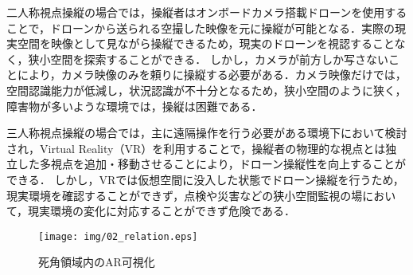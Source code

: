 \documentclass[submit, sigrecommended]{ipsj}
\begin{document}
二人称視点操縦の場合では，操縦者はオンボードカメラ搭載ドローンを使用することで，ドローンから送られる空撮した映像を元に操縦が可能となる\cite{article-drone08}．実際の現実空間を映像として見ながら操縦できるため，現実のドローンを視認することなく，狭小空間を探索することができる\cite{book-drone02}．
しかし，カメラが前方しか写さないことにより\cite{article-drone09}，カメラ映像のみを頼りに操縦する必要がある．カメラ映像だけでは，空間認識能力が低減し\cite{article-drone10}，状況認識が不十分となるため\cite{article-drone11}\cite{book-drone03}，狭小空間のように狭く，障害物が多いような環境では，操縦は困難である．
\par
三人称視点操縦の場合では，主に遠隔操作を行う必要がある環境下において検討され，Virtual Reality（VR）を利用することで，操縦者の物理的な視点とは独立した多視点を追加・移動させることにより，ドローン操縦性を向上することができる\cite{book-drone04}．
しかし，VRでは仮想空間に没入した状態でドローン操縦を行うため\cite{article-drone13}，現実環境を確認することができず，点検や災害などの狭小空間監視の場において，現実環境の変化に対応することができず危険である．


\begin{figure}[tb]
  \centering
  \texttt{[image: img/02\_relation.eps]}
  \caption{死角領域内のAR可視化}
  \label{fig:02_relation}
  \end{figure}
  
\end{document}
